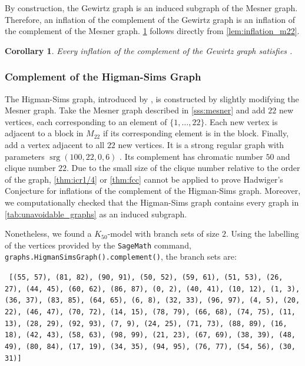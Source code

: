 \documentclass[11pt]{article}
\numberwithin{equation}{section}
\theoremstyle{plain}
\newtheorem{cor}[equation]{Corollary}
\theoremstyle{definition}
\DeclareMathOperator{\srg}{srg}
\begin{document}
By construction, the Gewirtz graph is an induced subgraph of the Mesner graph. Therefore, an inflation of the complement of the Gewirtz graph is an inflation of the complement of the Mesner graph. \cref{cor:gewirtz} follows directly from \cref{lem:inflation_m22}.

\begin{cor}
    \label{cor:gewirtz}
    Every inflation of the complement of the Gewirtz graph satisfies .
\end{cor}



\subsubsection{Complement of the Higman-Sims Graph}
\label{sss:higman_sims}
The Higman-Sims graph, introduced by \citet{higman1968simple}, is constructed by slightly modifying the Mesner graph. Take the Mesner graph described in \cref{sss:mesner} and add $22$ new vertices, each corresponding to an element of $\{1, \dots, 22\}$. Each new vertex is adjacent to a block in $M_{22}$ if its corresponding element is in the block. Finally, add a vertex adjacent to all $22$ new vertices. It is a strong regular graph with parameters $\srg(100, 22, 0, 6)$ \citep{HigmanSims}. Its complement has chromatic number $50$ and clique number $22$. Due to the small size of the clique number relative to the order of the graph, \cref{thm:icr1/4} or \cref{thm:fcc} cannot be applied to prove Hadwiger's Conjecture for inflations of the complement of the Higman-Sims graph. Moreover, we computationally checked that the Higman-Sims graph contains every graph in \cref{tab:unavoidable_graphs} as an induced subgraph.

Nonetheless, we found a $K_{50}$-model with branch sets of size $2$. Using the labelling of the vertices provided by the \texttt{SageMath} command,  {\texttt{graphs.HigmanSimsGraph().complement()}}, the branch sets are:
\begin{center}
    \vspace{-0.5em}
    \small{
        \texttt{
            [(55, 57), (81, 82), (90, 91), (50, 52), (59, 61), (51, 53), (26, 27), (44, 45), (60, 62), (86, 87), (0, 2), (40, 41), (10, 12), (1, 3), (36, 37), (83, 85), (64, 65), (6, 8), (32, 33), (96, 97), (4, 5), (20, 22), (46, 47), (70, 72), (14, 15), (78, 79), (66, 68), (74, 75), (11, 13), (28, 29), (92, 93), (7, 9), (24, 25), (71, 73), (88, 89), (16, 18), (42, 43), (58, 63), (98, 99), (21, 23), (67, 69), (38, 39), (48, 49), (80, 84), (17, 19), (34, 35), (94, 95), (76, 77), (54, 56), (30, 31)]
        }
    }
\end{center}
\end{document}
